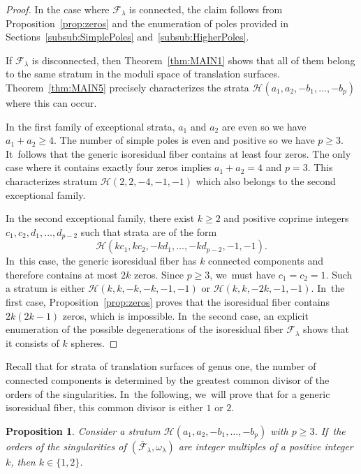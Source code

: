 \documentclass[JEP,XML,SOM,Unicode,NoFloatCountersInSection,published]{cedram}
\newtheorem{prop}[thm]{Proposition}
\theoremstyle{definition}
\begin{document}
\begin{proof}
In the case where $\mathcal{F}_{\lambda}$ is connected, the claim follows from Proposition~\ref{prop:zeros} and the enumeration of poles provided in Sections~\ref{subsub:SimplePoles} and~\ref{subsub:HigherPoles}.

If $\mathcal{F}_{\lambda}$ is disconnected, then Theorem~\ref{thm:MAIN1} shows that all of them belong to the same stratum in the moduli space of translation surfaces. Theorem~\ref{thm:MAIN5} precisely characterizes the strata $\mathcal{H}(a_{1},a_{2},-b_{1},\dots,-b_{p})$ where this can occur.

In the first family of exceptional strata, $a_{1}$ and $a_{2}$ are even so we have \hbox{$a_{1}\!+\!a_{2}\!\geq\! 4$}. The number of simple poles is even and positive so we have $p \geq 3$. It~follows that the generic isoresidual fiber contains at least four zeros. The only case where it contains exactly four zeros implies $a_{1}+a_{2}=4$ and $p=3$. This characterizes stratum $\mathcal{H}(2,2,-4,-1,-1)$ which also belongs to the second exceptional family.

In the second exceptional family, there exist $k \geq 2$ and positive coprime integers $c_{1},c_{2},d_{1},\dots,d_{p-2}$ such that strata are of the form
\[
\mathcal{H}(kc_{1},kc_{2},-kd_{1},\dots,-kd_{p-2},-1,-1).
\]
In~this case, the generic isoresidual fiber has $k$ connected components and therefore contains at most $2k$ zeros. Since $p \geq 3$, we~must have $c_{1}=c_{2}=1$. Such a stratum is either $\mathcal{H}(k,k,-k,-k,-1,-1)$ or $\mathcal{H}(k,k,-2k,-1,-1)$. In~the first case, Proposition~\ref{prop:zeros} proves that the isoresidual fiber contains $2k(2k-1)$ zeros, which is impossible. In~the second case, an explicit enumeration of the possible degenerations of the isoresidual fiber $\mathcal F_\lambda$ shows that it consists of $k$ spheres.
\end{proof}

Recall that for strata of translation surfaces of genus one, the number of connected components is determined by the greatest common divisor of the orders of the singularities. In~the following, we~will prove that for a generic isoresidual fiber, this common divisor is either $1$ or $2$.

\begin{prop}\label{prop:Factor}
Consider a stratum $\mathcal{H}(a_{1},a_{2},-b_{1},\dots,-b_{p})$ with $p \geq 3$. If~the orders of the singularities of $(\overline{\mathcal{F}}_{\lambda},\omega_{\lambda})$ are integer multiples of a positive integer $k$, then $k \in \lbrace{ 1,2 \rbrace}$.
\end{prop}
\end{document}
